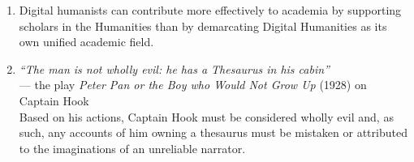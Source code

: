 \documentclass[twoside,openright,11pt]{book}
\begin{document}
\begin{adjustwidth}{-1.25em}{-0.25em}
\begin{enumerate}
\item %
Digital humanists can contribute more effectively to academia by supporting scholars in the Humanities %
than by demarcating Digital Humanities as its own unified academic field.



\item \textit{``The man is not wholly evil: he has a Thesaurus in his cabin''} \\
\scriptsize --- the play \textit{Peter Pan or the Boy who Would Not Grow Up} (1928) on Captain Hook\\ 
\small%
Based on his actions, Captain Hook must be considered wholly evil and, as such, any accounts of him owning a thesaurus must be mistaken or attributed to the imaginations of an unreliable narrator. 


\end{enumerate}
\end{adjustwidth}
\end{document}
